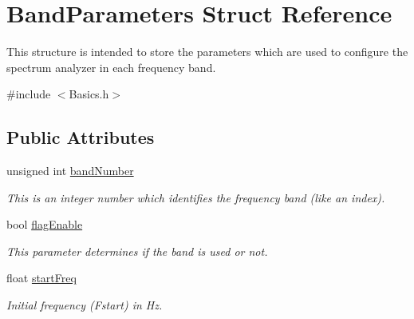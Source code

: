 \hypertarget{structBandParameters}{}\section{Band\+Parameters Struct Reference}
\label{structBandParameters}


This structure is intended to store the parameters which are used to configure the spectrum analyzer in each frequency band.  




{\ttfamily \#include $<$Basics.\+h$>$}

\subsection*{Public Attributes}
\begin{DoxyCompactItemize}
\item 
\mbox{\label{structBandParameters_a42a299b8715b4a56d532425f55970afb}} 
unsigned int \hyperlink{structBandParameters_a42a299b8715b4a56d532425f55970afb}{band\+Number}
\begin{DoxyCompactList}\small\item\em This is an integer number which identifies the frequency band (like an index). \end{DoxyCompactList}\item 
\mbox{\label{structBandParameters_a17711121a32967d8909a2aceadaa460b}} 
bool \hyperlink{structBandParameters_a17711121a32967d8909a2aceadaa460b}{flag\+Enable}
\begin{DoxyCompactList}\small\item\em This parameter determines if the band is used or not. \end{DoxyCompactList}\item 
\mbox{\label{structBandParameters_a5967170b243cbea1116fef7359a6d76b}} 
float \hyperlink{structBandParameters_a5967170b243cbea1116fef7359a6d76b}{start\+Freq}
\begin{DoxyCompactList}\small\item\em Initial frequency (Fstart) in Hz. \end{DoxyCompactList}\item 
\mbox{\label{structBandParameters_a16b27f71c4d551562078b583eb603a75}} 

\end{DoxyCompactItemize}
